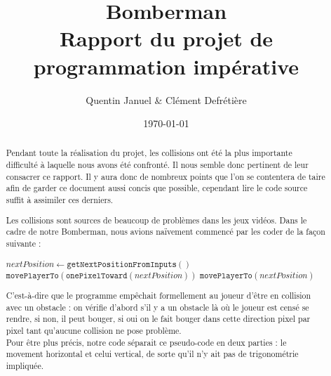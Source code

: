 \documentclass{article}
\title{
	Bomberman \\
	\large Rapport du projet de programmation impérative	
}
\date{\today}
\author{Quentin Januel & Clément Defrétière}
\begin{document}
\maketitle
\begin{abstract}
Pendant toute la réalisation du projet, les collisions ont été la plus importante difficulté à laquelle nous avons été confronté. Il nous semble donc pertinent de leur consacrer ce rapport. Il y aura donc de nombreux points que l'on se contentera de taire afin de garder ce document aussi concis que possible, cependant lire le code source suffit à assimiler ces derniers.
\newpage

Les collisions sont sources de beaucoup de problèmes dans les jeux vidéos. Dans le cadre de notre Bomberman, nous avions naïvement commencé par les coder de la façon suivante :
\begin{algorithm}
\begin{algorithmic}[1]
\State $nextPosition \gets \texttt{getNextPositionFromInputs}()$
\State $\texttt{movePlayerTo}(\texttt{onePixelToward}(nextPosition))$
\EndWhile
\Else
\State $\texttt{movePlayerTo}(nextPosition)$
\EndIf
\end{algorithmic}
\end{algorithm}

C'est-à-dire que le programme empêchait formellement au joueur d'être en collision avec un obstacle : on vérifie d'abord s'il y a un obstacle là où le joueur est censé se rendre, si non, il peut bouger, si oui on le fait bouger dans cette direction pixel par pixel tant qu'aucune collision ne pose problème. \\
Pour être plus précis, notre code séparait ce pseudo-code en deux parties : le movement horizontal et celui vertical, de sorte qu'il n'y ait pas de trigonométrie impliquée. \\


\end{abstract}
\end{document}

